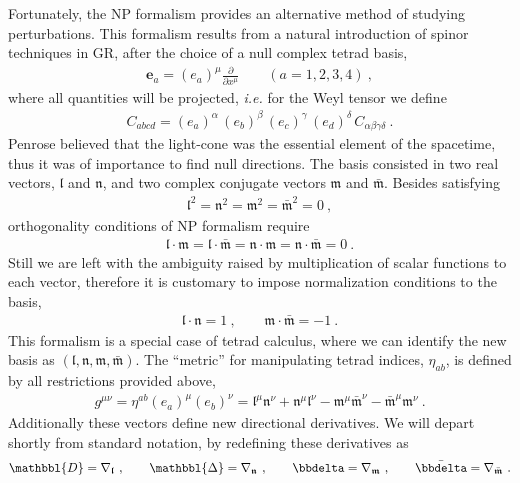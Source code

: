 Fortunately, the NP formalism \cite{Newman1962} provides an alternative method of studying perturbations.
This formalism results from a natural introduction of spinor techniques in GR, after the choice of a null complex tetrad basis,
\begin{align}
    \bm{e}_a = (e_a)^\mu \frac{\partial}{\partial x^\mu} \qquad (a = 1, 2, 3, 4) ~,
\end{align}
where all quantities will be projected, \emph{i.e.} for the Weyl tensor we define
\begin{align}
    C_{abcd} =  (e_a)^\alpha \,(e_b)^\beta \,(e_c)^\gamma \,(e_d)^\delta \,C_{\alpha\beta\gamma\delta} ~.
\end{align}
Penrose believed that the light-cone was the essential element of the spacetime, thus it was of importance to find null directions.
The basis consisted in two real vectors, $\bm{\mathfrak{l}}$ and $\bm{\mathfrak{n}}$, and two complex conjugate vectors $\bm{\mathfrak{m}}$ and $\bar{\bm{\mathfrak{m}}}$.
Besides satisfying
\begin{align}
    \bm{\mathfrak{l}}^2 = \bm{\mathfrak{n}}^2 = \bm{\mathfrak{m}}^2 = \bar{\bm{\mathfrak{m}}}^2 = 0 ~,
\end{align}
orthogonality conditions of NP formalism require
\begin{align}
   \bm{\mathfrak{l}} \cdot \bm{\mathfrak{m}} = \bm{\mathfrak{l}} \cdot \bar{\bm{\mathfrak{m}}} = \bm{\mathfrak{n}} \cdot \bm{\mathfrak{m}} = \bm{\mathfrak{n}} \cdot \bar{\bm{\mathfrak{m}}} = 0 ~.
\end{align}
Still we are left with the ambiguity raised by multiplication of scalar functions to each vector, therefore it is customary to impose normalization conditions to the basis,
\begin{align}
    \bm{\mathfrak{l}} \cdot \bm{\mathfrak{n}} = 1 ~, \qquad \bm{\mathfrak{m}} \cdot \bar{\bm{\mathfrak{m}}} = -1 ~.
\end{align}
This formalism is a special case of tetrad calculus, where we can identify the new basis as $(\bm{\mathfrak{l}},\bm{\mathfrak{n}},\bm{\mathfrak{m}},\bar{\bm{\mathfrak{m}}})$. The ``metric'' for manipulating tetrad indices, $\eta_{ab}$, is defined by all restrictions provided above,
\begin{align}
    g^{\mu\nu} = \eta^{ab} (e_a)^\mu (e_b)^\nu = \mathfrak{l}^{\mu} \mathfrak{n}^{\nu} + \mathfrak{n}^{\mu} \mathfrak{l}^{\nu} - \mathfrak{m}^{\mu} \bar{\mathfrak{m}}^{\nu} - \bar{\mathfrak{m}}^{\mu} \mathfrak{m}^{\nu} ~.
\end{align}
Additionally these vectors define new directional derivatives.
We will depart shortly from standard notation, by redefining these derivatives as
\begin{align}
    \mathbbl{D}=\nabla_{\bm{\mathfrak{l}}} ~,\qquad \mathbbl{\Delta}=\nabla_{\bm{\mathfrak{n}}} ~,\qquad \bbdelta=\nabla_{\bm{\mathfrak{m}}} ~,\qquad \bar{\bbdelta}=\nabla_{\bar{\bm{\mathfrak{m}}}} ~.
    \label{eq3:tetradCovDer}
\end{align}

